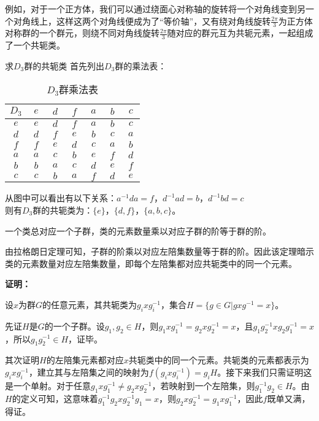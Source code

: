 例如，对于一个正方体，我们可以通过绕面心对称轴的旋转将一个对角线变到另一个对角线上，这样这两个对角线便成为了“等价轴”，又有绕对角线旋转$\frac{2\pi}{3}$为正方体对称群的一个群元，则绕不同对角线旋转$\frac{2\pi}{3}$随对应的群元互为共轭元素，一起组成了一个共轭类。

\begin{example}{求$D_3$群的共轭类}
首先列出$D_3$群的乘法表：
\begin{table}[ht]
\centering
\caption{$D_3$群乘法表}\label{tab_gpcon_1}
\begin{tabular}{|c|c|c|c|c|c|c|}
\hline
        $D_3$ & $~e~$ & $~d~$ & $~f~$ & $~a~$ & $~b~$ & $~c~$ \\ \hline
        $e$ & $e$ & $d$ & $f$ & $a$ & $b$ & $c$ \\ \hline
        $d$ & $d$ & $f$ & $e$ & $b$ & $c$ & $a$ \\ \hline
        $f$ & $f$ & $e$ & $d$ & $c$ & $a$ & $b$ \\ \hline
        $a$ & $a$ & $c$ & $b$ & $e$ & $f$ & $d$ \\ \hline
        $b$ & $b$ & $a$ & $c$ & $d$ & $e$ & $f$ \\ \hline
        $c$ & $c$ & $b$ & $a$ & $f$ & $d$ & $e$ \\ \hline
\end{tabular}
\end{table}

从图中可以看出有以下关系：$a^{-1}da=f$，$d^{-1}ad=b$，$d^{-1}bd=c$\\
则有$D_3$群的共轭类为：$\{e\}$，$\{d,f\}$，$\{a,b,c\}$。
\end{example}
\begin{theorem}{}
一个类总对应一个子群，类的元素数量乘以对应子群的阶等于群的阶。
\end{theorem}
由拉格朗日定理可知，子群的阶乘以对应左陪集数量等于群的阶。因此该定理暗示类的元素数量对应左陪集数量，即每个左陪集都对应共轭类中的同一个元素。

\textbf{证明：}

设$x$为群$G$的任意元素，其共轭类为$g_ixg_i^{-1}$，集合$H=\{ g\in G|gxg^{-1}=x\}$。

先证$H$是$G$的一个子群。设$g_1,g_2\in H$，则$g_1xg_1^{-1}=g_2xg_2^{-1}=x$，且$g_1g_2^{-1}xg_2g_1^{-1}=x$，所以$g_1g_2^{-1}\in H$，证毕。

其次证明$H$的左陪集元素都对应$x$共轭类中的同一个元素。共轭类的元素都表示为 $g_ixg_i^{-1}$，建立其与左陪集之间的映射为$f(g_ixg_i^{-1})=g_iH$。接下来我们只需证明这是一个单射。对于任意$g_1xg_1^{-1}\neq g_2xg_2^{-1}$，若映射到一个左陪集，则$g_1^{-1}g_2\in H$。由$H$的定义可知，这意味着$g_1^{-1}g_2xg_2^{-1}g_1=x$，则$g_2xg_2^{-1}=g_1xg_1^{-1}$，因此$f$既单又满，得证。


